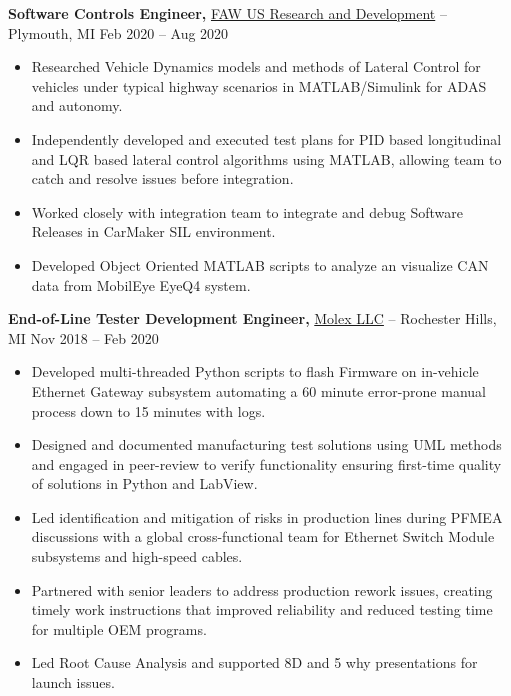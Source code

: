 \documentclass[11pt]{article}       %
\begin{document}
\textbf{Software Controls Engineer,} \href{}{FAW US Research and Development} -- Plymouth, MI \hfill Feb 2020 -- Aug 2020 \\
\vspace{-9pt}
\begin{itemize}
  \item Researched Vehicle Dynamics models and methods of Lateral Control for vehicles under typical highway scenarios in MATLAB/Simulink for ADAS and autonomy.
  \item Independently developed and executed test plans for PID based longitudinal and LQR based lateral control algorithms using MATLAB, allowing team to catch and resolve issues before integration.
  \item Worked closely with integration team to integrate and debug Software Releases in CarMaker SIL environment.
  \item Developed Object Oriented MATLAB scripts to analyze an visualize CAN data from MobilEye EyeQ4 system.
\end{itemize}


\textbf{End-of-Line Tester Development Engineer,} \href{}{Molex LLC} -- Rochester Hills, MI \hfill Nov 2018 -- Feb 2020 \\
\vspace{-9pt}
\begin{itemize}
  \item Developed multi-threaded Python scripts to flash Firmware on in-vehicle Ethernet Gateway subsystem automating a 60 minute error-prone manual process down to 15 minutes with logs.
  \item Designed and documented manufacturing test solutions using UML methods and engaged in peer-review to verify functionality ensuring first-time quality of solutions in Python and LabView.
  \item Led identification and mitigation of risks in production lines during PFMEA discussions with a global cross-functional team for Ethernet Switch Module subsystems and high-speed cables.
  \item Partnered with senior leaders to address production rework issues, creating timely work instructions that improved reliability and reduced testing time for multiple OEM programs.
  \item Led Root Cause Analysis and supported 8D and 5 why presentations for launch issues.
\end{itemize}
\end{document}
